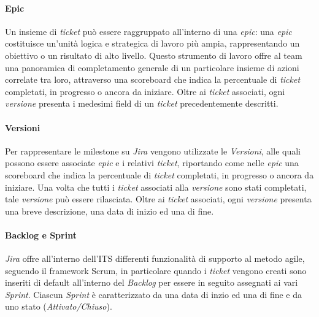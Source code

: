 \documentclass[10pt, a4paper]{article}
\begin{document}
\paragraph{Epic}
Un insieme di \textit{ticket} può essere raggruppato all'interno di una \textit{epic}: una \textit{epic} costituisce un'unità 
logica e strategica di lavoro più ampia, rappresentando un obiettivo o un risultato di alto livello. Questo strumento di lavoro offre
al team una panoramica di completamento generale di un particolare insieme di azioni correlate tra loro, attraverso una 
scoreboard che indica la percentuale di \textit{ticket} completati, in progresso o ancora da iniziare.
Oltre ai \textit{ticket} associati, ogni \textit{versione} presenta i medesimi field di un \textit{ticket} precedentemente descritti.

\paragraph{Versioni}
Per rappresentare le milestone su \textit{Jira} vengono utilizzate le \textit{Versioni}, alle quali possono essere associate \textit{epic}
e i relativi \textit{ticket}, riportando come nelle \textit{epic} una scoreboard che indica la percentuale di \textit{ticket} completati, in progresso o ancora da iniziare.
Una volta che tutti i \textit{ticket} associati alla \textit{versione} sono stati completati, tale \textit{versione} può essere rilasciata.
Oltre ai \textit{ticket} associati, ogni \textit{versione} presenta una breve descrizione, una data di inizio ed una di fine.

\paragraph{Backlog e Sprint}
\textit{Jira} offre all'interno dell'ITS differenti funzionalità di supporto al metodo agile, seguendo il framework Scrum, in particolare
quando i \textit{ticket} vengono creati sono inseriti di default all'interno del \textit{Backlog} per essere in seguito
assegnati ai vari \textit{Sprint}. 
Ciascun \textit{Sprint} è caratterizzato da una data di inzio ed una di fine e da uno stato (\textit{Attivato/Chiuso}).
\end{document}
